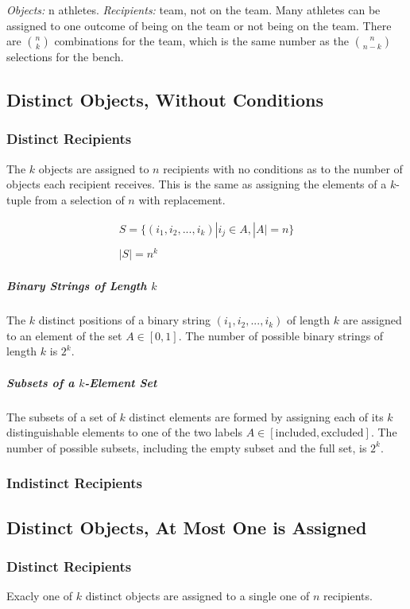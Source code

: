 \textit{Objects:} n athletes. \textit{Recipients:} team, not on the team. Many athletes can be assigned to one outcome of being on the team or not being on the team. There are ${n \choose k}$ combinations for the team, which is the same number as the ${n \choose n-k}$ selections for the bench. 

\subsection{Distinct Objects, Without Conditions}

\subsubsection{Distinct Recipients}
The $k$ objects are assigned to $n$ recipients with no conditions as to the number of objects each recipient receives. This is the same as assigning the elements of a $k$-tuple from a selection of $n$ with replacement.

\begin{equation}
\begin{array}{l}
S = \{ (i_1,i_2,...,i_k) | i_j \in A, |A| = n \}\\
\\
|S| = n^k
\end{array}
\end{equation}

\subparagraph{Binary Strings of Length $k$} The $k$ distinct positions of a binary string $(i_1,i_2,...,i_k)$ of length $k$ are assigned to an element of the set $A\in[0,1]$. The number of possible binary strings of length $k$ is $2^k$.

\subparagraph{Subsets of a $k$-Element Set} The subsets of a set of $k$ distinct elements are formed by assigning each of its $k$ distinguishable elements to one of the two labels $A\in [\mathrm{included},\mathrm{excluded}]$. The number of possible subsets, including the empty subset and the full set, is $2^k$.

\subsubsection{Indistinct Recipients}

\subsection{Distinct Objects, At Most One is Assigned}
\subsubsection{Distinct Recipients}
Exacly one of $k$ distinct objects are assigned to a single one of $n$ recipients. 

\chapauthor{}

